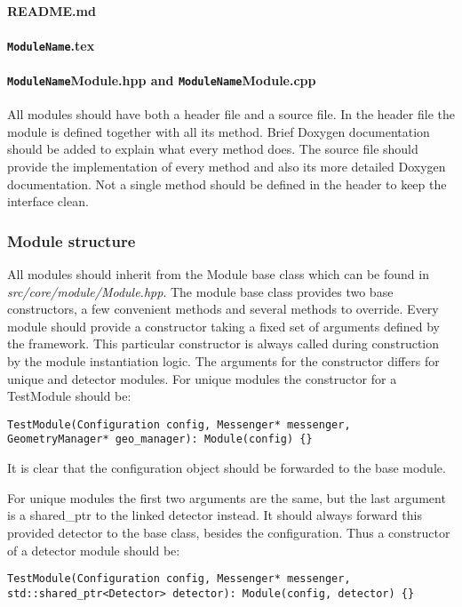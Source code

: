 \paragraph{README.md}
\wip

\paragraph{\texttt{ModuleName}.tex}
\wip

\paragraph{\texttt{ModuleName}Module.hpp and \texttt{ModuleName}Module.cpp}
All modules should have both a header file and a source file. In the header file the module is defined together with all its method. Brief Doxygen documentation should be added to explain what every method does. The source file should provide the implementation of every method and also its more detailed Doxygen documentation. Not a single method should be defined in the header to keep the interface clean.

\subsubsection{Module structure}
\label{sec:module_structure}
All modules should inherit from the Module base class which can be found in \textit{src/core/module/Module.hpp}. The module base class provides two base constructors, a few convenient methods and several methods to override. Every module should provide a constructor taking a fixed set of arguments defined by the framework. This particular constructor is always called during construction by the module instantiation logic. The arguments for the constructor differs for unique and detector modules. For unique modules the constructor for a TestModule should be:
\begin{verbatim}
TestModule(Configuration config, Messenger* messenger, GeometryManager* geo_manager): Module(config) {}
\end{verbatim}
It is clear that the configuration object should be forwarded to the base module.

For unique modules the first two arguments are the same, but the last argument is a shared\_ptr to the linked detector instead. It should always forward this provided detector to the base class, besides the configuration. Thus a constructor of a detector module should be:
\begin{verbatim}
TestModule(Configuration config, Messenger* messenger, std::shared_ptr<Detector> detector): Module(config, detector) {}
\end{verbatim}

